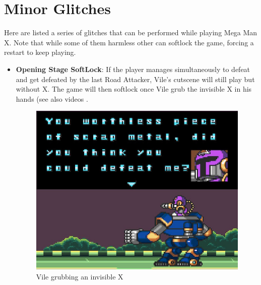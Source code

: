 \section{Minor Glitches}
Here are listed a series of glitches that can be performed while playing Mega Man X. Note that while some of them harmless other can softlock the game, forcing a restart to keep playing.
\begin{itemize}
	\item \textbf{Opening Stage SoftLock}: If the player manages simultaneously to defeat and get defeated by the last Road Attacker, Vile's cutscene will still play but without X. The game will then softlock once Vile grub the invisible X in his hands (see also videos .
	\begin{figure}[htp]
		\centering
		\includegraphics[width=0.5\linewidth]{figures/X1/Miscs/Intro_softlock.jpg}
		\caption{Vile grubbing an invisible X}
	\end{figure}
	

\end{itemize}

